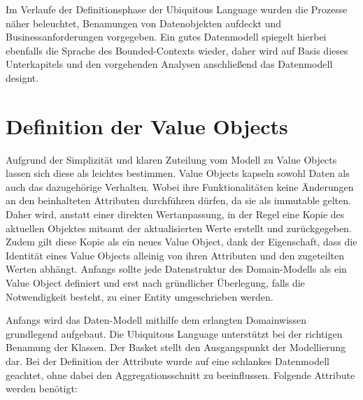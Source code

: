 
Im Verlaufe der Definitionsphase der Ubiquitous Language wurden die Prozesse näher beleuchtet, Benamungen von Datenobjekten aufdeckt und Businessanforderungen vorgegeben. Ein gutes Datenmodell spiegelt hierbei ebenfalls die Sprache des Bounded-Contexts wieder, daher wird auf Basis dieses Unterkapitels und den vorgehenden Analysen anschließend das Datenmodell designt. 

\section{Definition der Value Objects}
Aufgrund der Simplizität und klaren Zuteilung vom Modell zu Value Objects lassen sich diese als leichtes bestimmen. Value Objects kapseln sowohl Daten als auch das dazugehörige Verhalten. Wobei ihre Funktionalitäten keine Änderungen an den beinhalteten Attributen durchführen dürfen, da sie als immutable gelten. Daher wird, anstatt einer direkten Wertanpassung, in der Regel eine Kopie des aktuellen Objektes mitsamt der aktualisierten Werte erstellt und zurückgegeben. Zudem gilt diese Kopie als ein neues Value Object, dank der Eigenschaft, dass die Identität eines Value Objects alleinig von ihren Attributen und den zugeteilten Werten abhängt. Anfangs sollte jede Datenstruktur des Domain-Modells als ein Value Object definiert und erst nach gründlicher Überlegung, falls die Notwendigkeit besteht, zu einer Entity umgeschrieben werden.

Anfangs wird das Daten-Modell mithilfe dem erlangten Domainwissen grundlegend aufgebaut. Die Ubiquitous Language unterstützt bei der richtigen Benamung der Klassen. Der Basket stellt den Ausgangspunkt der Modellierung dar. Bei der Definition der Attribute wurde auf eine schlankes Datenmodell geachtet, ohne dabei den Aggregationsschnitt zu beeinflussen. Folgende Attribute werden benötigt:

